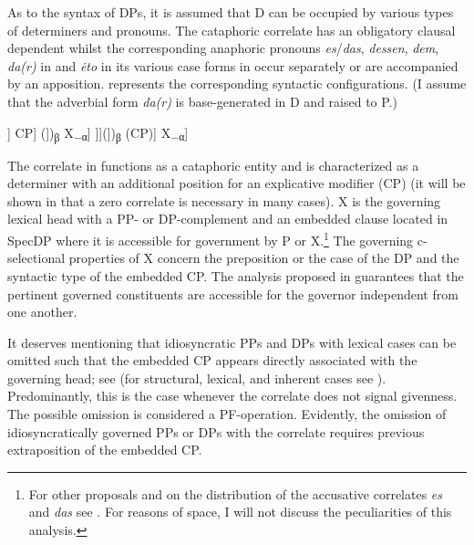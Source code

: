 \documentclass[output=paper]{langscibook}
\begin{document}
As to the syntax of DPs, it is assumed that D can be occupied by various types of determiners and pronouns. The cataphoric correlate has an obligatory clausal dependent whilst the corresponding anaphoric pronouns \textit{es}/\textit{das}, \textit{dessen}, \textit{dem}, \textit{da(r)} in  and \textit{ėto} in its various case forms in  occur separately or are accompanied by an apposition.  represents the corresponding syntactic configurations. (I assume that the  adverbial form \textit{da(r)} is base-generated in D and raised to P.)

\ea\label{ex:zimmermann:7}
    \ea\label{ex:zimmermann:7a}
    \Big[\textsubscript{XP} X\textsubscript{α} (\big[\textsubscript{PP} P)\textsubscript{β} [\textsubscript{DP} [\textsubscript{D$'$} [\textsubscript{D} \big\{\{\textit{es}/\textit{das}\}, \textit{to}, $\varnothing$\big\}]] CP] (\big])\textsubscript{β} X\textsubscript{$-$α}\Big]
    \ex\label{ex:zimmermann:7b} \Big[\textsubscript{XP} X\textsubscript{α} (\big[\textsubscript{PP} P)\textsubscript{β} [\textsubscript{DP} [\textsubscript{DP} [\textsubscript{D$'$} [\textsubscript{D} \big\{\{\textit{es}/\textit{das}\}, \textit{ėto}\big\}]]](])\textsubscript{β} (CP)\big] X\textsubscript{$-$α}\Big]
\z\z

\noindent The correlate in  functions as a cataphoric entity and is characterized as a determiner with an additional position for an explicative modifier (CP) (it will be shown in  that a zero correlate is necessary in many cases).
X is the governing lexical head with a PP- or DP-complement and an embedded clause located in SpecDP where it is accessible for government by P or X.\footnote{For other proposals and on the distribution of the accusative correlates \textit{es} and \textit{das} see \citet{Axel-ToberHollerKrause2016}. For reasons of space, I will not discuss the peculiarities of this analysis.} The governing c-selectional properties of X concern the preposition or the case of the DP and the syntactic type of the embedded CP. The analysis proposed in  guarantees that the pertinent governed constituents are accessible for the governor independent from one another.\largerpage[-1]

It deserves mentioning that idiosyncratic PPs and DPs with lexical cases can be omitted such that the embedded CP appears directly associated with the governing head; see  (for structural, lexical, and inherent cases see \citealt{SmirnovaJackendoff2017}). Predominantly, this is the case whenever the correlate does not signal givenness. The possible omission is considered a PF-operation. Evidently, the omission of idiosyncratically governed PPs or DPs with the correlate requires previous extraposition of the embedded CP.
\end{document}
